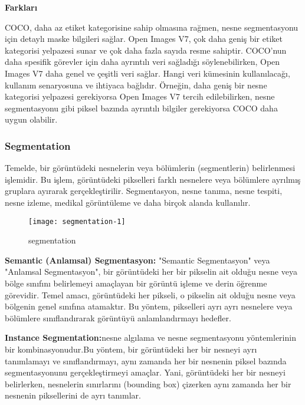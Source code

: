 \documentclass[11pt,a4paper]{report}
\begin{document}
\begin{justify}
   	\textbf{ Farkları}
   	\newline
   	
   	COCO, daha az etiket kategorisine sahip olmasına rağmen, nesne segmentasyonu için detaylı maske bilgileri sağlar.
   	Open Images V7, çok daha geniş bir etiket kategorisi yelpazesi sunar ve çok daha fazla sayıda resme sahiptir.
   	COCO'nun daha spesifik görevler için daha ayrıntılı veri sağladığı söylenebilirken, Open Images V7 daha genel ve çeşitli veri sağlar.
   	Hangi veri kümesinin kullanılacağı, kullanım senaryosuna ve ihtiyaca bağlıdır. Örneğin, daha geniş bir nesne kategorisi yelpazesi gerekiyorsa Open Images V7 tercih edilebilirken, nesne segmentasyonu gibi piksel bazında ayrıntılı bilgiler gerekiyorsa COCO daha uygun olabilir.\cite{ultralytics}
   	\newpage
   	
   	\subsubsection{Segmentation}
   	Temelde, bir görüntüdeki nesnelerin veya bölümlerin (segmentlerin) belirlenmesi işlemidir. Bu işlem, görüntüdeki pikselleri farklı nesnelere veya bölümlere ayrılmış gruplara ayırarak gerçekleştirilir. Segmentasyon, nesne tanıma, nesne tespiti, nesne izleme, medikal görüntüleme ve daha birçok alanda kullanılır.
   	
   	\begin{figure}[!h]
   		\centering
   		\texttt{[image: segmentation-1]}
   		\caption{segmentation}
   		\label{fig:ornek6}
   	\end{figure}
   	
   	\textbf{Semantic (Anlamsal) Segmentasyon:} "Semantic Segmentasyon" veya "Anlamsal Segmentasyon", bir görüntüdeki her bir pikselin ait olduğu nesne veya bölge sınıfını belirlemeyi amaçlayan bir görüntü işleme ve derin öğrenme görevidir. Temel amacı, görüntüdeki her pikseli, o pikselin ait olduğu nesne veya bölgenin genel sınıfına atamaktır. Bu yöntem, pikselleri ayrı ayrı nesnelere veya bölümlere sınıflandırarak görüntüyü anlamlandırmayı hedefler.
   	\newline
   	
   	\textbf{Instance Segmentation:}nesne algılama ve nesne segmentasyonu yöntemlerinin bir kombinasyonudur.Bu yöntem, bir görüntüdeki her bir nesneyi ayrı tanımlamayı ve sınıflandırmayı, aynı zamanda her bir nesnenin piksel bazında segmentasyonunu gerçekleştirmeyi amaçlar. Yani, görüntüdeki her bir nesneyi belirlerken, nesnelerin sınırlarını (bounding box) çizerken aynı zamanda her bir nesnenin piksellerini de ayrı tanımlar.
   	

\end{justify}
\end{document}
